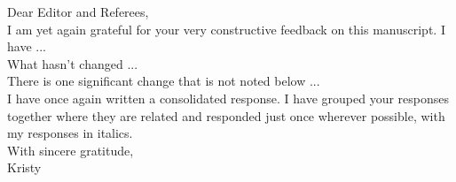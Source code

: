 \documentclass[12pt]{article}
\begin{document}
Dear Editor and Referees, \\

I am yet again grateful for your very constructive feedback on this manuscript. I have ... \\

What hasn't changed ...  \\

There is one significant change that is not noted below ... \\

I have once again written a consolidated response. I have grouped your responses together where they are related and responded just once wherever possible, with my responses in italics. \\

With sincere gratitude,\\
Kristy

\begin{comment}
\vskip.5in
\section{Clarify ``non-unitary'' interpretation of the model}
\textbf{Editor Point 1}: \\
The "non-unitary" interpretation of your model is not entirely clear to me. When you say that lobbying can change the identity of the median legislator, what mechanism do you have in mind? Does lobbying influence the composition of the legislature, by affecting who gets elected? Or does lobbying somehow change the identity of the median legislator without affecting the composition of the legislature, i.e. without affecting elections? Your current wording suggests the latter, but I am not quite sure. And if it is the latter that you have in mind, how can lobbying change the identity of the median legislator without affecting the distribution of legislators? Perhaps by affecting the decision making process, e.g. who gets to sit on the relevant committees? And if so, is it appropriate to refer to the decisive legislator as the "median" legislator? All of this needs to be clarified.
\begin{itemize}
\renewcommand\labelitemi{-}
	\item \textit{I have clarified the interpretation after Expression (2) in Section 2.2. I do imagine the latter interpretation, but I think in some situations the former makes sense. I have a project currently underway in which I take the electoral approach in explaining the gradual reduction in trade barriers over the post-WWII period. Here, I think it is more of a stretch because we would have to imagine a new election for each enforcement phase of the game.}
\end{itemize}
\end{comment}
\end{document}
